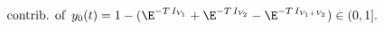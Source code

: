 \begin{equation}
\text{contrib.
of}\,\,\,y_0(t)=1-(\E^{-T\,I_{V_1}}+\E^{-T\,I_{V_2}}-\E^{-T\,I_{V_1+V_2}})
\in (0,1]. \label{2.4}
\end{equation}

